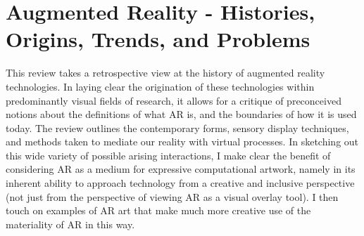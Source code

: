 \chapter{Augmented Reality - Histories, Origins, Trends, and Problems}
\label{sec: review}
\epigraph{\emph{}}{}
This review takes a retrospective view at the history of augmented reality technologies. In laying clear the origination of these technologies within predominantly visual fields of research, it allows for a critique of preconceived notions about the definitions of what AR is, and the boundaries of how it is used today. The review outlines the contemporary forms, sensory display techniques, and methods taken to mediate our reality with virtual processes. In sketching out this wide variety of possible arising interactions, I make clear the benefit of considering AR as a medium for expressive computational artwork, namely in its inherent ability to approach technology from a creative and inclusive perspective (not just from the perspective of viewing AR as a visual overlay tool). I then touch on examples of AR art that make much more creative use of the materiality of AR in this way.



